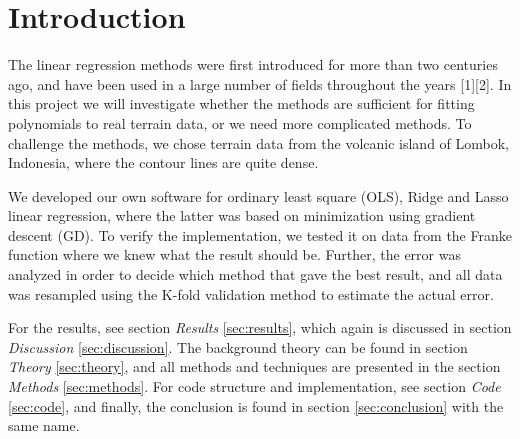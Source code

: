\section{Introduction} \label{sec:introduction}
The linear regression methods were first introduced for more than two centuries ago, and have been used in a large number of fields throughout the years [1][2]. In this project we will investigate whether the methods are sufficient for fitting polynomials to real terrain data, or we need more complicated methods. To challenge the methods, we chose terrain data from the volcanic island of Lombok, Indonesia, where the contour lines are quite dense. 

We developed our own software for ordinary least square (OLS), Ridge and Lasso linear regression, where the latter was based on minimization using gradient descent (GD). To verify the implementation, we tested it on data from the Franke function where we knew what the result should be. Further, the error was analyzed in order to decide which method that gave the best result, and all data was resampled using the K-fold validation method to estimate the actual error. 

For the results, see section \textit{Results} \eqref{sec:results}, which again is discussed in section \textit{Discussion} \eqref{sec:discussion}. The background theory can be found in section \textit{Theory} \eqref{sec:theory}, and all methods and techniques are presented in the section \textit{Methods} \eqref{sec:methods}. For code structure and implementation, see section \textit{Code} \eqref{sec:code}, and finally, the conclusion is found in section \eqref{sec:conclusion} with the same name.